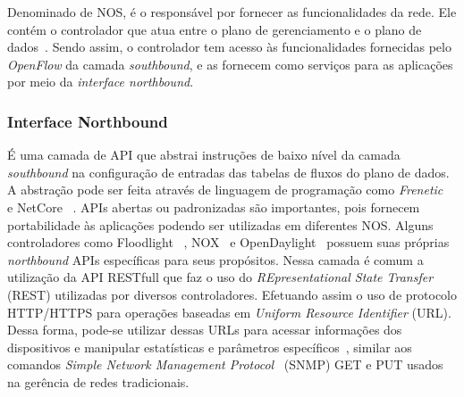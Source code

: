 Denominado de NOS, é o responsável por fornecer as funcionalidades da rede. Ele contém o controlador que atua entre o plano de gerenciamento e o plano de dados~\cite{xie2015control}. Sendo assim, o controlador tem acesso às funcionalidades fornecidas pelo \textit{OpenFlow} da camada \textit{southbound}, e as fornecem como serviços para as aplicações por meio da \textit{interface northbound}.



\subsubsection{Interface Northbound} 

É uma camada de API que abstrai instruções de baixo nível da camada \textit{southbound} na configuração de entradas das tabelas de fluxos do plano de dados. A abstração pode ser feita através de linguagem de programação como \textit{Frenetic}~\cite{foster2011frenetic} e NetCore ~\cite{monsanto2012compiler}. APIs abertas ou padronizadas são importantes, pois fornecem portabilidade às aplicações podendo ser utilizadas em diferentes NOS. Alguns controladores como Floodlight ~\cite{floodlight2012}, NOX~\cite{nox2008} e OpenDaylight~\cite{opendaylight2014} possuem suas próprias \textit{northbound} APIs específicas para seus propósitos. Nessa camada é comum a utilização da API RESTfull que faz o uso do \emph{REpresentational  State  Transfer} (REST) utilizadas por diversos controladores. Efetuando assim o uso de protocolo HTTP/HTTPS para operações baseadas em \emph{Uniform  Resource  Identifier} (URL). Dessa forma, pode-se utilizar dessas URLs para acessar informações dos dispositivos e manipular estatísticas e parâmetros específicos~\cite{zhou2014}, similar aos comandos \textit{Simple Network Management Protocol} ~(SNMP) GET e PUT usados na gerência de redes tradicionais.



